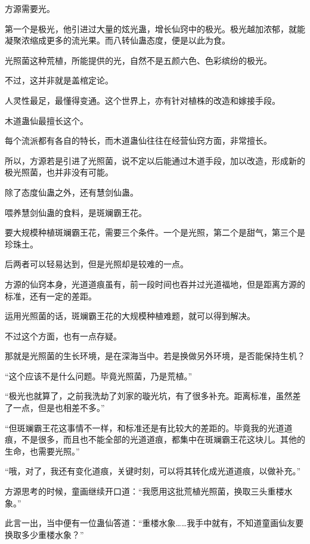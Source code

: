 
\begin{this_body}



方源需要光。

第一个是极光，他引进过大量的炫光蛊，增长仙窍中的极光。极光越加浓郁，就能凝聚浓缩成更多的流光果。而八转仙蛊态度，便是以此为食。

光照菌这种荒植，所能提供的光，自然不是五颜六色、色彩缤纷的极光。

不过，这并非就是盖棺定论。

人灵性最足，最懂得变通。这个世界上，亦有针对植株的改造和嫁接手段。

木道蛊仙最擅长这个。

每个流派都有各自的特长，而木道蛊仙往往在经营仙窍方面，非常擅长。

所以，方源若是引进了光照菌，说不定以后能通过木道手段，加以改造，形成新的极光照菌，也并非没有可能。

除了态度仙蛊之外，还有慧剑仙蛊。

喂养慧剑仙蛊的食料，是斑斓霸王花。

要大规模种植斑斓霸王花，需要三个条件。一个是光照，第二个是甜气，第三个是珍珠土。

后两者可以轻易达到，但是光照却是较难的一点。

方源的仙窍本身，光道道痕虽有，前一段时间也吞并过光道福地，但是距离方源的标准，还有一定的差距。

运用光照菌的话，斑斓霸王花的大规模种植难题，就可以得到解决。

不过这个方面，也有一点存疑。

那就是光照菌的生长环境，是在深海当中。若是换做另外环境，是否能保持生机？

“这个应该不是什么问题。毕竟光照菌，乃是荒植。”

“极光也就算了，之前我洗劫了刘家的璇光坑，有了很多补充。距离标准，虽然差了一点，但是也相差不多。”

“但斑斓霸王花这事情不一样，和标准还是有比较大的差距的。毕竟我的光道道痕，不是很多，而且也不能全部的光道道痕，都集中在斑斓霸王花这块儿。其他的生命，也需要光照。”

“哦，对了，我还有变化道痕，关键时刻，可以将其转化成光道道痕，以做补充。”

方源思考的时候，童画继续开口道：“我愿用这批荒植光照菌，换取三头重楼水象。”

此言一出，当中便有一位蛊仙答道：“重楼水象……我手中就有，不知道童画仙友要换取多少重楼水象？”


\end{this_body}
